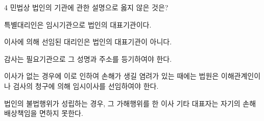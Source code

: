 \begin{question}{4}
민법상 법인의 기관에 관한 설명으로 옳지 않은 것은?
\begin{choices}
  \item 특별대리인은 임시기관으로 법인의 대표기관이다.
  \item 이사에 의해 선임된 대리인은 법인의 대표기관이 아니다.
  \item 감사는 필요기관으로 그 성명과 주소를 등기하여야 한다.
  \item 이사가 없는 경우에 이로 인하여 손해가 생길 염려가 있는 때에는 법원은 이해관계인이나 검사의 청구에 의해 임시이사를 선임하여야 한다.
  \item 법인의 불법행위가 성립하는 경우, 그 가해행위를 한 이사 기타 대표자는 자기의 손해배상책임을 면하지 못한다.
\end{choices}
\end{question}
